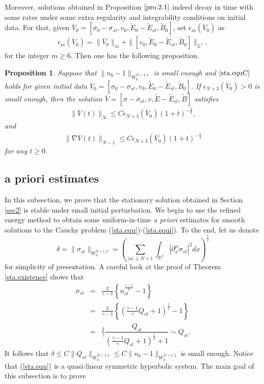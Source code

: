 \documentclass[11pt]{amsart}
\newtheorem{proposition}{Proposition}[section]
\numberwithin{equation}{section}
\begin{document}
Moreover, solutions obtained in Proposition $ \ref{pro.2.1}$ indeed
decay in time with some rates under some extra regularity and
integrability conditions on initial data. For that, given
$\bar{V}_{0}=[\sigma_{0}-\sigma_{st},v_{0},\tilde{E}_0-\tilde{E}_{st},\tilde{B}_{0}]$,
set $\epsilon_{m}(\bar{V}_0)$ as
\begin{eqnarray}\label{def.epsi}
\epsilon_{m}(\bar{V}_0)=\|\bar{V}_{0}\|_{m}+\|[v_{0},\tilde{E}_0-\tilde{E}_{st},\tilde{B}_{0}]\|_{L^{1}},
\end{eqnarray}
for the  integer $m \geq 6$. Then one has the following proposition.
\begin{proposition}\label{pro.2.2}
Suppose that $\|n_{b}-1\|_{W_{0}^{N+4,2}}$ is small enough and
$\eqref{sta.equC}$ holds for given initial data
$\bar{V}_{0}=[\sigma_{0}-\sigma_{st},v_{0},\tilde{E}_0-\tilde{E}_{st},\tilde{B}_{0}]$.
If $\epsilon_{N+3}(\bar{V}_{0})>0$ is small enough, then the
solution
$\bar{V}=[\sigma-\sigma_{st},v,\tilde{E}-\tilde{E}_{st},\tilde{B}] $
satisfies
\begin{eqnarray}\label{V.decay}
\|\bar{V}(t)\|_{N} \leq C
\epsilon_{N+3}(\bar{V}_{0})(1+t)^{-\frac{3}{4}},
\end{eqnarray}
and
\begin{eqnarray}\label{nablaV.decay}
\|\nabla \bar{V}(t)\|_{N-1} \leq C
\epsilon_{N+3}(\bar{V}_{0})(1+t)^{-\frac{5}{4}}
\end{eqnarray}
for any $t\geq 0$.
\end{proposition}

\subsection{a priori estimates} In this subsection, we prove that the stationary
solution obtained in Section \ref{sec2} is stable under small
initial perturbation.
 We begin to use the refined energy
method to obtain some uniform-in-time {\it a priori} estimates for
smooth solutions to the Cauchy problem
(\ref{sta.equ})-(\ref{sta.equi}). To the end, let us denote
\begin{equation}\label{def.delta}
\delta=\|\sigma_{st}\|_{W_{0}^{N+1,2}}=\left(\sum_{|\alpha|\leq
N+1}\int_{\mathbb{R}^3}|\partial^{\alpha}_{x}\sigma_{st}|^2dx\right)^{\frac{1}{2}}
\end{equation}
for simplicity of presentation. A careful look at the proof of
Theorem \ref{sta.existence} shows that
\begin{eqnarray*}
\sigma_{st}&=&\frac{2}{\gamma-1}\left\{n_{st}^{\frac{\gamma-1}{2}}-1\right\}\\
                &=&\frac{2}{\gamma-1}\left\{\left(\frac{\gamma-1}{\gamma}Q_{st}+1\right)^{\frac{1}{2}}-1\right\}\\
                &=&\frac{2}{\gamma}\dfrac{Q_{st}}{\left(\frac{\gamma-1}{\gamma}Q_{st}+1\right)^{\frac{1}{2}}+1}\sim
                Q_{st}.
\end{eqnarray*}
It follows that $\delta \leq C\|Q_{st}\|_{W_{0}^{N+1,2}}\leq
C\|n_{b}-1\|_{W_{0}^{N+1,2}}$ is small enough. Notice that
(\ref{sta.equ}) is a quasi-linear symmetric hyperbolic system. The
main goal of this subsection is to prove
\end{document}
